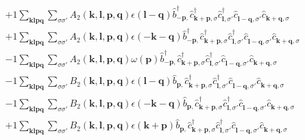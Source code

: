 \begin{align*}
	&+1 \sum_{ \mathbf{k} \mathbf{l} \mathbf{p} \mathbf{q} } \sum_{ \sigma \sigma' } A_2( \mathbf{k}, \mathbf{l}, \mathbf{p}, \mathbf{q} )  \epsilon( \mathbf{l}-\mathbf{q} )   \hat{b}_{ -\mathbf{p}, }^\dagger  \hat{c}_{ \mathbf{k}+\mathbf{p}, \sigma }^\dagger  \hat{c}_{ \mathbf{l}, \sigma' }^\dagger  \hat{c}_{ \mathbf{l}-\mathbf{q}, \sigma' }^{\phantom{\dagger}} \hat{c}_{ \mathbf{k}+\mathbf{q}, \sigma }^{\phantom{\dagger}}  \\
	&+1 \sum_{ \mathbf{k} \mathbf{l} \mathbf{p} \mathbf{q} } \sum_{ \sigma \sigma' } A_2( \mathbf{k}, \mathbf{l}, \mathbf{p}, \mathbf{q} )  \epsilon( -\mathbf{k}-\mathbf{q} )   \hat{b}_{ -\mathbf{p}, }^\dagger  \hat{c}_{ \mathbf{k}+\mathbf{p}, \sigma }^\dagger  \hat{c}_{ \mathbf{l}, \sigma' }^\dagger  \hat{c}_{ \mathbf{l}-\mathbf{q}, \sigma' }^{\phantom{\dagger}} \hat{c}_{ \mathbf{k}+\mathbf{q}, \sigma }^{\phantom{\dagger}}  \\
	&-1 \sum_{ \mathbf{k} \mathbf{l} \mathbf{p} \mathbf{q} } \sum_{ \sigma \sigma' } A_2( \mathbf{k}, \mathbf{l}, \mathbf{p}, \mathbf{q} )  \omega( \mathbf{p} )   \hat{b}_{ -\mathbf{p}, }^\dagger  \hat{c}_{ \mathbf{k}+\mathbf{p}, \sigma }^\dagger  \hat{c}_{ \mathbf{l}, \sigma' }^\dagger  \hat{c}_{ \mathbf{l}-\mathbf{q}, \sigma' }^{\phantom{\dagger}} \hat{c}_{ \mathbf{k}+\mathbf{q}, \sigma }^{\phantom{\dagger}}  \\
	&-1 \sum_{ \mathbf{k} \mathbf{l} \mathbf{p} \mathbf{q} } \sum_{ \sigma \sigma' } B_2( \mathbf{k}, \mathbf{l}, \mathbf{p}, \mathbf{q} )  \epsilon( \mathbf{l}-\mathbf{q} )   \hat{b}_{ \mathbf{p}, }^{\phantom{\dagger}} \hat{c}_{ \mathbf{k}+\mathbf{p}, \sigma }^\dagger  \hat{c}_{ \mathbf{l}, \sigma' }^\dagger  \hat{c}_{ \mathbf{l}-\mathbf{q}, \sigma' }^{\phantom{\dagger}} \hat{c}_{ \mathbf{k}+\mathbf{q}, \sigma }^{\phantom{\dagger}}  \\
	&-1 \sum_{ \mathbf{k} \mathbf{l} \mathbf{p} \mathbf{q} } \sum_{ \sigma \sigma' } B_2( \mathbf{k}, \mathbf{l}, \mathbf{p}, \mathbf{q} )  \epsilon( -\mathbf{k}-\mathbf{q} )   \hat{b}_{ \mathbf{p}, }^{\phantom{\dagger}} \hat{c}_{ \mathbf{k}+\mathbf{p}, \sigma }^\dagger  \hat{c}_{ \mathbf{l}, \sigma' }^\dagger  \hat{c}_{ \mathbf{l}-\mathbf{q}, \sigma' }^{\phantom{\dagger}} \hat{c}_{ \mathbf{k}+\mathbf{q}, \sigma }^{\phantom{\dagger}}  \\
	&+1 \sum_{ \mathbf{k} \mathbf{l} \mathbf{p} \mathbf{q} } \sum_{ \sigma \sigma' } B_2( \mathbf{k}, \mathbf{l}, \mathbf{p}, \mathbf{q} )  \epsilon( \mathbf{k}+\mathbf{p} )   \hat{b}_{ \mathbf{p}, }^{\phantom{\dagger}} \hat{c}_{ \mathbf{k}+\mathbf{p}, \sigma }^\dagger  \hat{c}_{ \mathbf{l}, \sigma' }^\dagger  \hat{c}_{ \mathbf{l}-\mathbf{q}, \sigma' }^{\phantom{\dagger}} \hat{c}_{ \mathbf{k}+\mathbf{q}, \sigma }^{\phantom{\dagger}}  \\

\end{align*}
